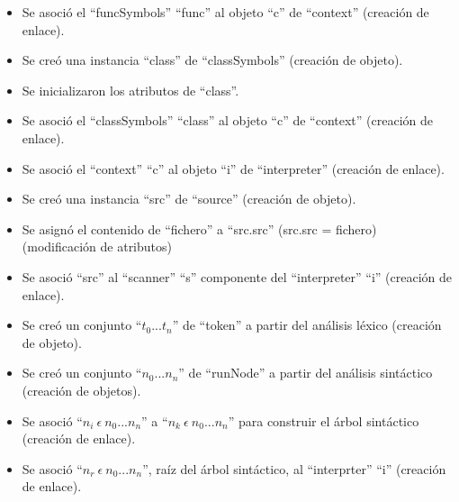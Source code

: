 \begin{framed}
\begin{description}
\begin {itemize}
         \item Se asoció el ``funcSymbols'' ``func'' al objeto ``c'' de ``context'' (creación de enlace).
         \item Se creó una instancia ``class'' de ``classSymbols'' (creación de objeto).
         \item Se inicializaron los atributos de ``class''.
         \item Se asoció el ``classSymbols'' ``class'' al objeto ``c'' de ``context'' (creación de enlace).
         \item Se asoció el ``context'' ``c'' al objeto ``i'' de ``interpreter'' (creación de enlace).
         \item Se creó una instancia ``src'' de ``source'' (creación de objeto).
         \item Se asignó el contenido de ``fichero'' a ``src.src'' (src.src = fichero) (modificación de atributos)
         \item Se asoció ``src'' al ``scanner'' ``s'' componente del ``interpreter'' ``i'' (creación de enlace). 
         \item Se creó un conjunto ``$t_0...t_n$'' de ``token'' a partir del análisis léxico (creación de objeto).
         \item Se creó un conjunto ``$n_0...n_n$'' de ``runNode'' a partir del análisis sintáctico (creación de objetos).
         \item Se asoció ``$n_i\ \epsilon\ n_0...n_n$'' a ``$n_k\ \epsilon\ n_0...n_n$'' para construir el árbol sintáctico (creación de enlace).
         \item Se asoció  ``$n_r\ \epsilon\ n_0...n_n$'', raíz del árbol sintáctico, al ``interprter'' ``i'' (creación de enlace).
      \end{itemize}
	\end{description}
\end{framed}
\FloatBarrier

